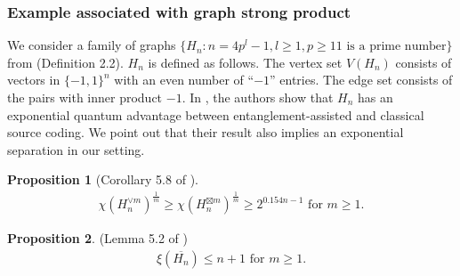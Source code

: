 \documentclass[journal, onecolumn, draftcls]{IEEEtran}
\theoremstyle{definition}
\newtheorem{proposition}{Proposition}
\newcommand{\bbC}{\mathbb{C}}
\newcommand{\meng}[1]{\marginpar{+}{\bf Ruoyu's remark}: {\em #1}}
\newcommand{\aditya}[1]{\marginpar{+}{\bf Aditya's remark}: {\em #1}}
\begin{document}
\subsubsection{Example associated with graph strong product\label{subsubsec:Hn}}
We consider a family of graphs $\{H_n:n=4p^l-1, l\ge 1, p\ge 11\text{ is a prime number}\}$ from \cite{BrietBL_15} (Definition 2.2). $H_n$ is defined as follows. The vertex set $V(H_n)$ consists of vectors in $\{-1,1\}^n$ with an even number of ``$-1$'' entries. The edge set consists of the pairs with inner product  $-1$. In \cite{BrietBL_15}, the authors show that $H_n$ has an exponential quantum advantage between entanglement-assisted and classical source coding. We point out that their result also implies an exponential separation in our setting.
\begin{proposition}[Corollary 5.8 of \cite{BrietBL_15}]\label{prop:lower_bound_H_n}
    \begin{align*}
       \chi(H_n^{\lor m})^{\frac{1}{m}} \ge \chi(H_n^{\boxtimes m})^{\frac{1}{m}} \ge 2^{0.154n - 1}\text{ for }m\ge 1.
    \end{align*}
\end{proposition}
\begin{proposition}(Lemma 5.2 of \cite{BrietBL_15})\label{prop:xi_of_H_n}
    \begin{align*}
 \xi(\overline{H_n}) \le n+1\text{ for }m\ge 1.
    \end{align*}
\end{proposition}
\end{document}
